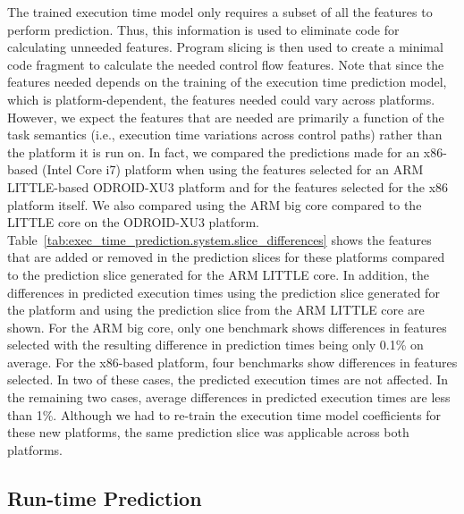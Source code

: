 The trained execution time model only requires a subset of all the features to
perform prediction. Thus, this information is used to eliminate code for
calculating unneeded features.  Program slicing is then used to create a
minimal code fragment to calculate the needed control flow features.  Note that
since the features needed depends on the training of the execution time
prediction model, which is platform-dependent, the features needed could vary
across platforms. However, we expect the features that are needed are
primarily a function of the task semantics (i.e., execution time variations
across control paths) rather than the platform it is run on. In fact, we
compared the predictions made for an x86-based (Intel Core i7) platform when
using the features selected for an ARM LITTLE-based ODROID-XU3 platform and for the
features selected for the x86 platform itself. We also compared using the ARM
big core compared to the LITTLE core on the ODROID-XU3 platform. 
Table~\ref{tab:exec_time_prediction.system.slice_differences} shows the
features that are added or removed in the prediction slices for these platforms
compared to the prediction slice generated for the ARM LITTLE core. In
addition, the differences in predicted execution times using the prediction
slice generated for the platform and using the prediction slice from the ARM
LITTLE core are shown. 
For the ARM big core, only one benchmark shows differences in features selected
with the resulting difference in prediction times being only 0.1\% on average.
For the x86-based platform, four benchmarks show differences in features
selected. In two of these cases, the predicted execution times are not
affected. In the remaining two cases, average differences in predicted
execution times are less than 1\%.
Although we had to re-train the execution time model coefficients for these new
platforms, the same prediction slice was applicable across both platforms.

\subsection{Run-time Prediction}

